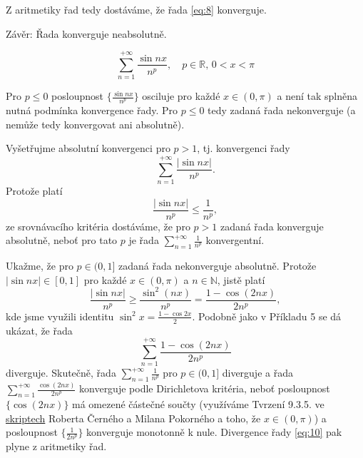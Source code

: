 \documentclass[answers]{exam}
\begin{document}
\begin{questions}
\begin{solution}
  	Z aritmetiky řad tedy dostáváme, že řada \eqref{eq:8} konverguje.
  	
  	Závěr: Řada konverguje neabsolutně.
  \end{solution}
  
  \question
  \begin{equation*}
    \sum_{n = 1}^{+\infty}
    \frac{\sin nx}{n^p},
    \quad
    p \in \mathbb{R}, \, 0 < x < \pi
  \end{equation*}
  
  \begin{solution}
  	Pro $p \le 0$ posloupnost $\{ \frac{\sin nx}{n^p} \}$ osciluje pro každé $x \in (0, \pi)$ a není tak splněna nutná podmínka konvergence řady. Pro $p \le 0$ tedy zadaná řada nekonverguje (a nemůže tedy konvergovat ani absolutně).
  	
  	Vyšetřujme absolutní konvergenci pro $p > 1$, tj. konvergenci řady
  	\begin{equation*}
	    \sum_{n = 1}^{+\infty}
	    \frac{\left| \sin nx \right|}{n^p}. 		
  	\end{equation*}
  	Protože platí
  	\begin{equation*}
  		\frac{\left| \sin nx \right|}{n^p}
  		\le
  		\frac{1}{n^p},
  	\end{equation*}
  	ze srovnávacího kritéria dostáváme, že pro $p > 1$ zadaná řada konverguje absolutně, neboť pro tato $p$ je řada $\sum_{n = 1}^{+\infty} \frac{1}{n^p}$ konvergentní.
  	
  	Ukažme, že pro $p \in (0, 1]$ zadaná řada nekonverguje absolutně. Protože $\left| \sin n x \right| \in [0, 1]$ pro každé $x \in (0, \pi)$ a $n \in \mathbb{N}$, jistě platí
  	\begin{equation}
  		\frac{\left| \sin nx \right|}{n^p}
  		\ge
  		\frac{\sin^2 (nx)}{n^p} 
  		=
		  \frac{1 - \cos(2nx)}{2 n^p},	
  	\end{equation}
  	kde jsme využili identitu $\sin^2 x = \frac{1 - \cos 2x}{2}$. Podobně jako v Příkladu 5 se dá ukázat, že řada
  	\begin{equation}
  		\label{eq:10}
  		\sum_{n = 1}^{+\infty}
  		\frac{1 - \cos(2nx)}{2 n^p}
  	\end{equation}
  	diverguje. Skutečně, řada $\sum_{n = 1}^{+\infty} \frac{1}{n^p}$ pro $p \in (0, 1]$ diverguje a řada $\sum_{n = 1}^{+\infty} \frac{\cos(2nx)}{2 n^p}$ konverguje podle Dirichletova kritéria, neboť posloupnost $\{ \cos(2nx) \}$ má omezené částečné součty (využíváme Tvrzení 9.3.5. ve \href{http://www.karlin.mff.cuni.cz/~pokorny/skripta_MAF2.pdf}{skriptech} Roberta Černého a Milana Pokorného a toho, že $x \in (0, \pi)$) a posloupnost $\{ \frac{1}{2 n^p} \}$ konverguje monotonně k nule. Divergence řady \eqref{eq:10} pak plyne z aritmetiky řad.
  	

\end{solution}
\end{questions}
\end{document}
